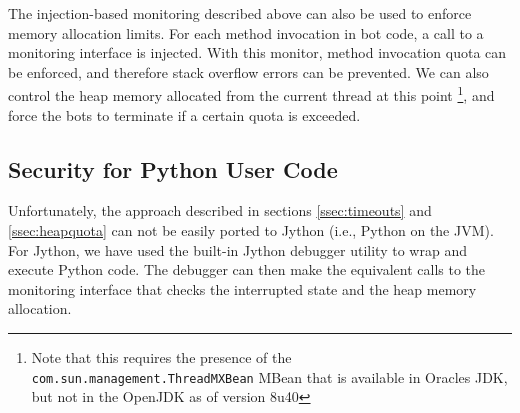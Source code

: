 The injection-based monitoring described above can also be used to enforce memory allocation limits. For each method invocation in bot code, a call to a monitoring interface is injected. With this monitor, method invocation quota can be enforced, and therefore stack overflow errors can be prevented. We can also control the heap memory allocated from the current thread at this point \footnote{Note that this requires the presence of the \texttt{com.sun.management.ThreadMXBean} MBean that is available in Oracles JDK, but not in the OpenJDK as of version 8u40}, and force the bots to terminate if a certain quota is exceeded.
\label{ssec:heapquota}

\subsection{Security for Python User Code}
\label{ssec:jythoninstrumentation}

Unfortunately, the approach described in sections \ref{ssec:timeouts} and \ref{ssec:heapquota} can not be easily ported to Jython (i.e., Python on the JVM). For Jython, we have used the built-in Jython debugger utility to wrap and execute Python code. The debugger can then make the equivalent calls to the monitoring interface that checks the interrupted state and the heap memory allocation. 